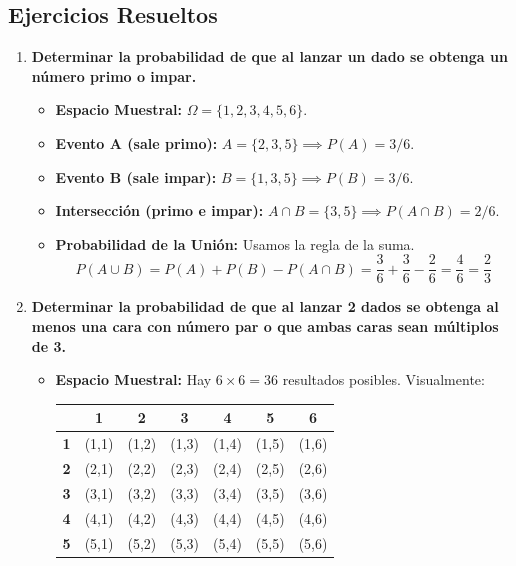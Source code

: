 \documentclass[12pt, letterpaper]{article}
\begin{document}
\subsection{Ejercicios Resueltos}
\begin{enumerate}
	\item \textbf{Determinar la probabilidad de que al lanzar un dado se obtenga un número primo o impar.}
	      \begin{itemize}
		      \item \textbf{Espacio Muestral:} $\Omega = \{1,2,3,4,5,6\}$.
		      \item \textbf{Evento A (sale primo):} $A=\{2,3,5\} \implies P(A) = 3/6$.
		      \item \textbf{Evento B (sale impar):} $B=\{1,3,5\} \implies P(B) = 3/6$.
		      \item \textbf{Intersección (primo e impar):} $A \cap B = \{3,5\} \implies P(A \cap B) = 2/6$.
		      \item \textbf{Probabilidad de la Unión:} Usamos la regla de la suma.
		            \[ P(A\cup B) = P(A) + P(B) - P(A \cap B) = \frac{3}{6} + \frac{3}{6} - \frac{2}{6} = \frac{4}{6} = \frac{2}{3} \]
	      \end{itemize}
	\item \textbf{Determinar la probabilidad de que al lanzar 2 dados se obtenga al menos una cara con número par o que ambas caras sean múltiplos de 3.}
	      \begin{itemize}
		      \item \textbf{Espacio Muestral:} Hay $6 \times 6 = 36$ resultados posibles. Visualmente:
		            \begin{center}
			            \begin{tabular}{c|cccccc}
				                       & \textbf{1} & \textbf{2} & \textbf{3} & \textbf{4} & \textbf{5} & \textbf{6} \\
				            \hline
				            \textbf{1} & (1,1)      & (1,2)      & (1,3)      & (1,4)      & (1,5)      & (1,6)      \\
				            \textbf{2} & (2,1)      & (2,2)      & (2,3)      & (2,4)      & (2,5)      & (2,6)      \\
				            \textbf{3} & (3,1)      & (3,2)      & (3,3)      & (3,4)      & (3,5)      & (3,6)      \\
				            \textbf{4} & (4,1)      & (4,2)      & (4,3)      & (4,4)      & (4,5)      & (4,6)      \\
				            \textbf{5} & (5,1)      & (5,2)      & (5,3)      & (5,4)      & (5,5)      & (5,6)      \\

\end{tabular}
\end{center}
\end{itemize}
\end{enumerate}
\end{document}
